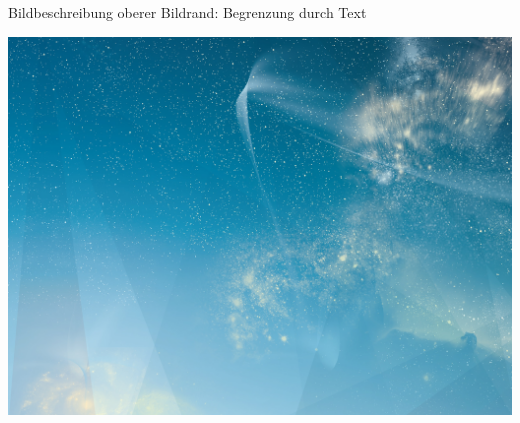 \begin{frame}

    Bildbeschreibung\newline
    oberer Bildrand: Begrenzung durch Text

\vspace*{-3mm}
\begin{minipage}[t][0cm]{\paperwidth}%
\hspace*{-\PraesentationSeitenrand}%
\includegraphics[width=\paperwidth]{./Resources/Images/SternenhimmelQuer.jpg}
\end{minipage}
    
\end{frame}
\clearpage

